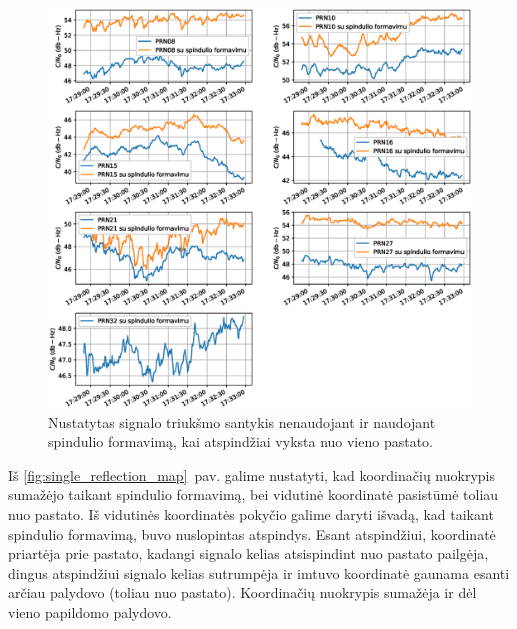 \documentclass[main.tex]{subfiles}
\begin{document}
\begin{figure}[ht]
    \begin{centering}
    \includegraphics[scale=0.6]{drawings/one_reflection_snr}
    \par\end{centering}
    \protect\caption{\label{fig:single_reflection_snr}Nustatytas signalo triukšmo santykis nenaudojant ir naudojant spindulio formavimą, kai atspindžiai vyksta nuo vieno pastato.}
\end{figure}

Iš \ref{fig:single_reflection_map}~pav. galime nustatyti, kad koordinačių nuokrypis sumažėjo taikant spindulio
formavimą, bei vidutinė koordinatė pasistūmė toliau nuo pastato. Iš vidutinės koordinatės pokyčio
galime daryti išvadą, kad taikant spindulio formavimą, buvo nuslopintas atspindys. Esant atspindžiui,
koordinatė priartėja prie pastato, kadangi signalo kelias atsispindint nuo pastato pailgėja, dingus
atspindžiui signalo kelias sutrumpėja ir imtuvo koordinatė gaunama esanti arčiau palydovo (toliau nuo pastato).
Koordinačių nuokrypis sumažėja ir dėl vieno papildomo palydovo.
\end{document}
